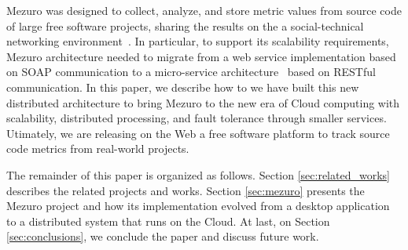 Mezuro was designed to collect, analyze, and store metric values from source
code of large free software projects, sharing the results on the a
social-technical networking environment~\cite{mezuro2012}. In particular, to
support its scalability requirements, Mezuro architecture needed to migrate
from a web service implementation based on SOAP communication to a
micro-service architecture~\cite{namiot2014micro} based on RESTful
communication. In this paper, we describe how to we have built this new
distributed architecture to bring Mezuro to the new era of Cloud computing with
scalability, distributed processing, and fault tolerance through smaller
services. Utimately, we are releasing on the Web a free software platform to
track source code metrics from real-world projects.

The remainder of this paper is organized as follows. Section
\ref{sec:related_works} describes the related projects and works. Section
\ref{sec:mezuro} presents the Mezuro project and how its implementation evolved
from a desktop application to a distributed system that runs on the Cloud. At
last, on Section \ref{sec:conclusions}, we conclude the paper and discuss
future work.
